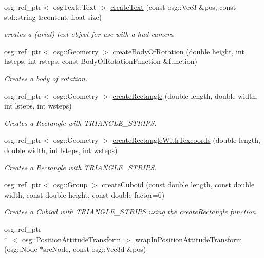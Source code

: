 \begin{DoxyCompactItemize}
osg\+::ref\+\_\+ptr$<$ osg\+Text\+::\+Text $>$ \hyperlink{namespacebrtr_a4431de1c1fa2c1d42c4fb57c38aaa3ce}{create\+Text} (const osg\+::\+Vec3 \&pos, const std\+::string \&content, float size)
\begin{DoxyCompactList}\small\item\em creates a (arial) text object for use with a hud camera \end{DoxyCompactList}\item 
osg\+::ref\+\_\+ptr$<$ osg\+::\+Geometry $>$ \hyperlink{namespacebrtr_a83d3e627c9dc247459610aa9fec23d7b}{create\+Body\+Of\+Rotation} (double height, int hsteps, int rsteps, const \hyperlink{structbrtr_1_1_body_of_rotation_function}{Body\+Of\+Rotation\+Function} \&function)
\begin{DoxyCompactList}\small\item\em Creates a body of rotation. \end{DoxyCompactList}\item 
osg\+::ref\+\_\+ptr$<$ osg\+::\+Geometry $>$ \hyperlink{namespacebrtr_a793c6ef7f57632fc5ac280b94f60dd65}{create\+Rectangle} (double length, double width, int lsteps, int wsteps)
\begin{DoxyCompactList}\small\item\em Creates a Rectangle with T\+R\+I\+A\+N\+G\+L\+E\+\_\+\+S\+T\+R\+I\+P\+S. \end{DoxyCompactList}\item 
osg\+::ref\+\_\+ptr$<$ osg\+::\+Geometry $>$ \hyperlink{namespacebrtr_a4e91424e74398a612c38a920df0577ef}{create\+Rectangle\+With\+Texcoords} (double length, double width, int lsteps, int wsteps)
\begin{DoxyCompactList}\small\item\em Creates a Rectangle with T\+R\+I\+A\+N\+G\+L\+E\+\_\+\+S\+T\+R\+I\+P\+S. \end{DoxyCompactList}\item 
osg\+::ref\+\_\+ptr$<$ osg\+::\+Group $>$ \hyperlink{namespacebrtr_ae7f155c263aec9663a02763ed0bb882b}{create\+Cuboid} (const double length, const double width, const double height, const double factor=6)
\begin{DoxyCompactList}\small\item\em Creates a Cubiod with T\+R\+I\+A\+N\+G\+L\+E\+\_\+\+S\+T\+R\+I\+P\+S using the create\+Rectangle function. \end{DoxyCompactList}\item 
osg\+::ref\+\_\+ptr\\*
$<$ osg\+::\+Position\+Attitude\+Transform $>$ \hyperlink{namespacebrtr_a887d7975f37c4334b70e2196735b6678}{wrap\+In\+Position\+Attitude\+Transform} (osg\+::\+Node $\ast$src\+Node, const osg\+::\+Vec3d \&pos)

\end{DoxyCompactItemize}
